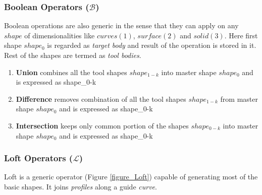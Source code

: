 \subsubsection{Boolean Operators ($\mathcal{B}$)}

Boolean operations are also generic in the sense that they can apply on any $shape$ of dimensionalities like $curves(1)$, $surface(2)$ and $solid(3)$. 
Here first shape $shape_0$ is regarded as {\em target body} and result of the operation is stored in it. Rest of the shapes are termed as {\em tool bodies}.

\begin{enumerate}
\item {\bf Union} combines all the tool shapes ${shape_{1-k}}$ into master shape $shape_0$ and is expressed as	 {shape_{0-k}} 	
\item {\bf Difference} removes combination of all the tool shapes ${shape_{1-k}}$ from master shape $shape_0$ and is expressed as	 {shape_{0-k}}  
\item {\bf Intersection} keeps only common portion of the shapes ${shape_{0-k}}$ into master shape $shape_0$ and is expressed as	 {shape_{0-k}} 	 
\end{enumerate}


\subsubsection{Loft Operators ($\mathcal{L}$)}

Loft is a generic operator (Figure \ref{figure_Loft})  capable of generating most of the basic shapes. It joins {\em profiles} along a guide {\em curve}. 

